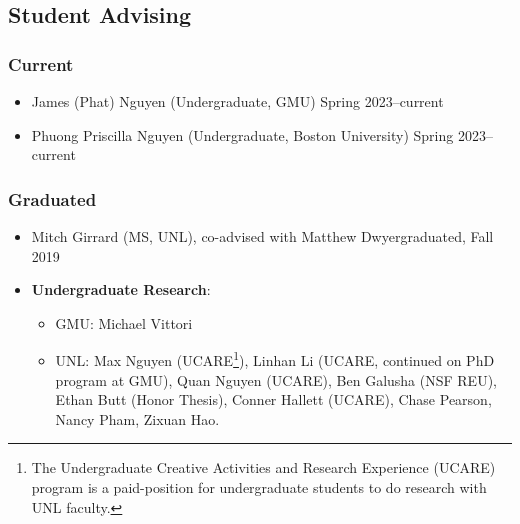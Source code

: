 \documentclass[11pt]{article}
\begin{document}
{
  \subsection{Student Advising}
  
  \subsubsection{Current}
  \begin{itemize}
    \haiduong{}    
    \didier{}
    \linhan{}
    \item James (Phat) Nguyen (Undergraduate, GMU) \hfill Spring 2023--current
    \item Phuong Priscilla Nguyen (Undergraduate, Boston University) \hfill Spring 2023--current

  \end{itemize}

  \subsubsection{Graduated}
  \begin{itemize}
    \kimhao{}
    \guolong{}
    \alex{}
  \item Mitch Girrard (MS, UNL), co-advised with Matthew Dwyer\hfill graduated, Fall 2019
    
  \item \textbf{Undergraduate Research}:
    \begin{itemize}
    \item GMU: Michael Vittori
    \item UNL: Max Nguyen (UCARE\footnote{The Undergraduate Creative Activities and Research Experience (UCARE) program is a paid-position for undergraduate students to do research with UNL faculty.}), Linhan Li (UCARE, continued on PhD program at GMU), Quan Nguyen (UCARE), Ben Galusha (NSF REU), Ethan Butt (Honor Thesis), Conner Hallett (UCARE), Chase Pearson, Nancy Pham, Zixuan Hao.
  \end{itemize}
  \end{itemize}
}
\end{document}
